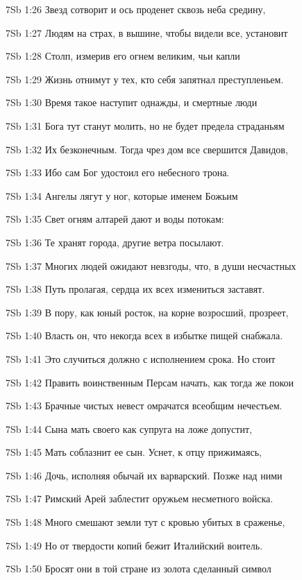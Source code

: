 \vs 7Sb 1:26 Звезд сотворит и ось проденет сквозь неба средину, 

\vs 7Sb 1:27 Людям на страх, в вышине, чтобы видели все, установит 

\vs 7Sb 1:28 Столп, измерив его огнем великим, чьи капли 

\vs 7Sb 1:29 Жизнь отнимут у тех, кто себя запятнал преступленьем. 

\vs 7Sb 1:30 Время такое наступит однажды, и смертные люди 

\vs 7Sb 1:31 Бога тут станут молить, но не будет предела страданьям 

\vs 7Sb 1:32 Их безконечным. Тогда чрез дом все свершится Давидов, 

\vs 7Sb 1:33 Ибо сам Бог удостоил его небесного трона. 

\vs 7Sb 1:34 Ангелы лягут у ног, которые именем Божьим 

\vs 7Sb 1:35 Свет огням алтарей дают и воды  потокам: 

\vs 7Sb 1:36 Те хранят города, другие  ветра посылают.

\vs 7Sb 1:37 Многих людей ожидают невзгоды, что, в души несчастных 

\vs 7Sb 1:38 Путь пролагая, сердца их всех измениться заставят.

\vs 7Sb 1:39 В пору, как юный росток, на корне возросший, прозреет, 

\vs 7Sb 1:40 Власть он, что некогда всех в избытке пищей снабжала.

\vs 7Sb 1:41 Это случиться должно с исполнением срока. Но стоит 

\vs 7Sb 1:42 Править воинственным Персам начать, как тогда же покои 

\vs 7Sb 1:43 Брачные чистых невест омрачатся всеобщим нечестьем. 

\vs 7Sb 1:44 Сына мать своего как супруга на ложе допустит, 

\vs 7Sb 1:45 Мать соблазнит ее сын. Уснет, к отцу прижимаясь,

\vs 7Sb 1:46 Дочь, исполняя обычай их варварский. Позже над ними 

\vs 7Sb 1:47 Римский Арей заблестит оружьем несметного войска. 

\vs 7Sb 1:48 Много смешают земли тут с кровью убитых в сраженье, 

\vs 7Sb 1:49 Но от твердости копий бежит Италийский воитель. 

\vs 7Sb 1:50 Бросят они в той стране из золота сделанный символ 


